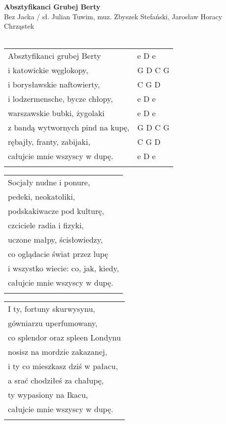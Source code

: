 \documentclass[a5paper]{article}
\begin{document}


\noindent
\fontsize{12pt}{15pt}\selectfont
\textbf{Absztyfikanci Grubej Berty} \\
\fontsize{8pt}{10pt}\selectfont
Bez Jacka / sł. Julian Tuwim, muz. Zbyszek Stefański, Jarosław Horacy Chrząstek \\ \\
\fontsize{10pt}{12pt}\selectfont
{}
\begin{tabular}{@{}p{9.0cm}p{3cm}@{}}
\noindent
Absztyfikanci grubej Berty & e D e \\
i katowickie węglokopy, & G D C G \\
i borysławskie naftowierty, & C G D \\
i lodzermensche, bycze chłopy, & e D e \\
warszawskie bubki, żygolaki & e D e \\
z bandą wytwornych pind na kupę, & G D C G \\
rębajły, franty, zabijaki, & C G D \\
całujcie mnie wszyscy w dupę. & e D e \\ \\
\end{tabular}

\noindent
\begin{tabular}{@{}p{9.5cm}@{}}
Socjały nudne i ponure, \\
pedeki, neokatoliki, \\
podskakiwacze pod kulturę, \\
czciciele radia i fizyki, \\
uczone małpy, ścisłowiedzy, \\
co oglądacie świat przez lupę \\
i wszystko wiecie: co, jak, kiedy, \\
całujcie mnie wszyscy w dupę. \\ \\
\end{tabular}

\noindent
\begin{tabular}{@{}p{9.5cm}@{}}
I ty, fortuny skurwysynu, \\
gówniarzu uperfumowany, \\
co splendor oraz spleen Londynu \\
nosisz na mordzie zakazanej, \\
i ty co mieszkasz dziś w pałacu, \\
a srać chodziłeś za chałupę, \\
ty wypasiony na Ikacu, \\
całujcie mnie wszyscy w dupę. \\ \\
\end{tabular}
\end{document}
